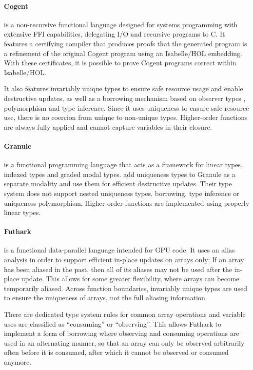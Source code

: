 \paragraph{Cogent \citep{oconnor_cogent_2021}} is a non-recursive functional language designed for systems programming with extensive FFI capabilities, delegating I/O and recursive programs to C. It features a certifying compiler that produces proofs that the generated program is a refinement of the original Cogent program using an Isabelle/HOL \citep{nipkow_isabellehol_2002} embedding. With these certificates, it is possible to prove Cogent programs correct within Isabelle/HOL. 

It also features invariably unique types to ensure safe resource usage and enable destructive updates, as well as a borrowing mechanism based on observer types \citep{odersky_observers_1992}, polymorphism and type inference. Since it uses uniqueness to ensure safe resource use, there is no coercion from unique to non-unique types. Higher-order functions are always fully applied and cannot capture variables in their closure.

\paragraph{Granule \citep{orchard_quantitative_2019}} is a functional programming language that acts as a framework for linear types, indexed types and graded modal types. \cite{sergey_linearity_2022} add uniqueness types to Granule as a separate modality and use them for efficient destructive updates. Their type system does not support nested uniqueness types, borrowing, type inference or uniqueness polymorphism. Higher-order functions are implemented using properly linear types. 

\paragraph{Futhark \citep{henriksen_futhark_2017}} is a functional data-parallel language intended for GPU code. It uses an alias analysis in order to support efficient in-place updates on arrays only: If an array has been aliased in the past, then all of its aliases may not be used after the in-place update. This allows for some greater flexibility, where arrays can become temporarily aliased. Across function boundaries, invariably unique types are used to ensure the uniqueness of arrays, not the full aliasing information. 

There are dedicated type system rules for common array operations and variable uses are classified as ``consuming'' or ``observing''. This allows Futhark to implement a form of borrowing where observing and consuming operations are used in an alternating manner, so that an array can only be observed arbitrarily often before it is consumed, after which it cannot be observed or consumed anymore.

